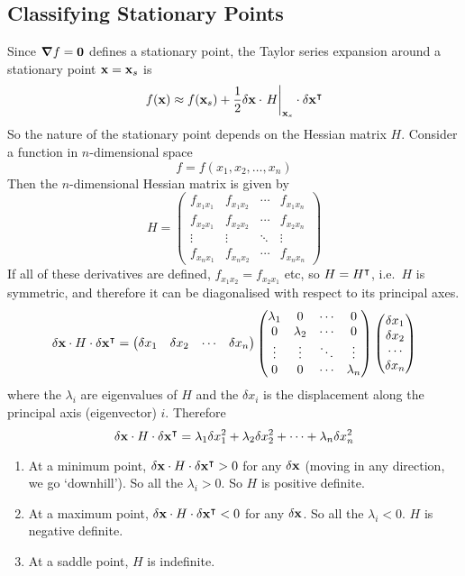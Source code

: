\subsection{Classifying Stationary Points}
Since \(\grad f = \vb 0\) defines a stationary point, the Taylor series expansion around a stationary point \(\vb x = \vb x_s\) is
\[
	f(\vb x) \approx f(\vb x_s) + \frac{1}{2}\delta \vb x \cdot \eval{H}_{\vb x_s} \cdot \delta \vb x^\transpose
\]
So the nature of the stationary point depends on the Hessian matrix \(H\).
Consider a function in \(n\)-dimensional space
\[
	f = f(x_1, x_2, \dots, x_n)
\]
Then the \(n\)-dimensional Hessian matrix is given by
\[
	H = \begin{pmatrix}
		f_{x_1 x_1} & f_{x_1 x_2} & \cdots & f_{x_1 x_n} \\
		f_{x_2 x_1} & f_{x_2 x_2} & \cdots & f_{x_2 x_n} \\
		\vdots      & \vdots      & \ddots & \vdots      \\
		f_{x_n x_1} & f_{x_n x_2} & \cdots & f_{x_n x_n}
	\end{pmatrix}
\]
If all of these derivatives are defined, \(f_{x_1x_2} = f_{x_2x_1}\) etc, so \(H = H^\intercal\), i.e.\ \(H\) is symmetric, and therefore it can be diagonalised with respect to its principal axes.
\[
	\delta \vb x \cdot H \cdot \delta \vb x^\intercal = \begin{pmatrix}
		\delta x_1 & \delta x_2 & \cdots & \delta x_n
	\end{pmatrix} \begin{pmatrix}
		\lambda_1 & 0         & \cdots & 0         \\
		0         & \lambda_2 & \cdots & 0         \\
		\vdots    & \vdots    & \ddots & \vdots    \\
		0         & 0         & \cdots & \lambda_n
	\end{pmatrix} \begin{pmatrix}
		\delta x_1 \\ \delta x_2 \\ \cdots \\ \delta x_n
	\end{pmatrix}
\]
where the \(\lambda_i\) are eigenvalues of \(H\) and the \(\delta x_i\) is the displacement along the principal axis (eigenvector) \(i\).
Therefore
\[
	\delta \vb x \cdot H \cdot \delta \vb x^\intercal = \lambda_1 \delta x_1^2 + \lambda_2 \delta x_2^2 + \dots + \lambda_n \delta x_n^2
\]
\begin{enumerate}
	\item At a minimum point, \(\delta \vb x \cdot H \cdot \delta \vb x^\intercal > 0\) for any \(\delta \vb x\) (moving in any direction, we go `downhill').
	      So all the \(\lambda_i > 0\).
	      So \(H\) is positive definite.
	\item At a maximum point, \(\delta \vb x \cdot H \cdot \delta \vb x^\intercal < 0\) for any \(\delta \vb x\).
	      So all the \(\lambda_i < 0\).
	      \(H\) is negative definite.
	\item At a saddle point, \(H\) is indefinite.
\end{enumerate}

